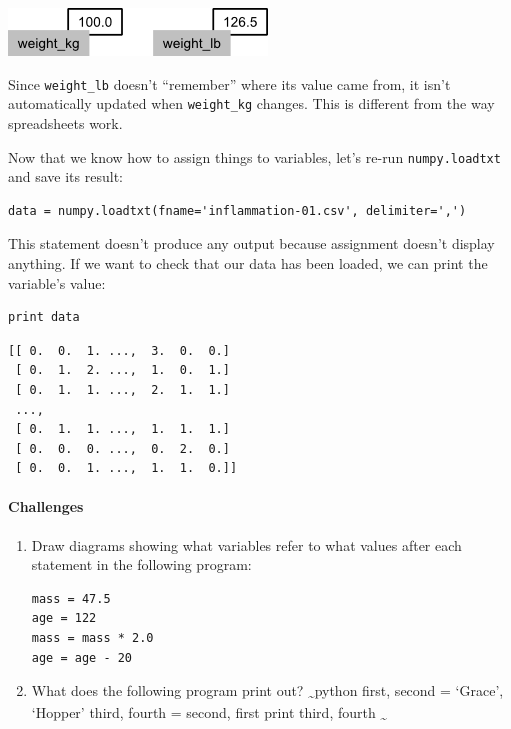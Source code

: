 \documentclass[]{book}
\begin{document}
\includegraphics{novice/python/img/python-sticky-note-variables-03.png}

Since \texttt{weight\_lb} doesn't ``remember'' where its value came
from, it isn't automatically updated when \texttt{weight\_kg} changes.
This is different from the way spreadsheets work.

Now that we know how to assign things to variables, let's re-run
\texttt{numpy.loadtxt} and save its result:

\begin{verbatim}
data = numpy.loadtxt(fname='inflammation-01.csv', delimiter=',')
\end{verbatim}

This statement doesn't produce any output because assignment doesn't
display anything. If we want to check that our data has been loaded, we
can print the variable's value:

\begin{verbatim}
print data
\end{verbatim}

\begin{verbatim}
[[ 0.  0.  1. ...,  3.  0.  0.]
 [ 0.  1.  2. ...,  1.  0.  1.]
 [ 0.  1.  1. ...,  2.  1.  1.]
 ...,
 [ 0.  1.  1. ...,  1.  1.  1.]
 [ 0.  0.  0. ...,  0.  2.  0.]
 [ 0.  0.  1. ...,  1.  1.  0.]]
\end{verbatim}

\mbox{}\paragraph{Challenges}

\begin{enumerate}
\item
  Draw diagrams showing what variables refer to what values after each
  statement in the following program:

\begin{verbatim}
mass = 47.5
age = 122
mass = mass * 2.0
age = age - 20
\end{verbatim}
\item
  What does the following program print out?
  \textsubscript{\textasciitilde{}}python first, second = `Grace',
  `Hopper' third, fourth = second, first print third, fourth
  \textsubscript{\textasciitilde{}}
\end{enumerate}
\end{document}

